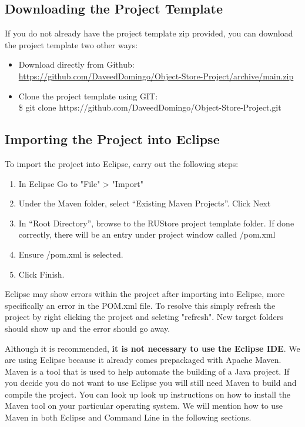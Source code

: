 \documentclass{article}
\begin{document}
\subsection{Downloading the Project Template}
If you do not already have the project template zip provided, you can download the project template two other ways:
\begin{itemize}
\item Download directly from Github:\\ \href{https://github.com/DaveedDomingo/Object-Store-Project/archive/main.zip}{https://github.com/DaveedDomingo/Object-Store-Project/archive/main.zip}
\item Clone the project template using GIT:\\ \$ git clone https://github.com/DaveedDomingo/Object-Store-Project.git
\end{itemize} 

\subsection{Importing the Project into Eclipse}
To import the project into Eclipse, carry out the following steps:
\begin{enumerate}
\item In Eclipse Go to "File" > "Import"
\item Under the Maven folder, select “Existing Maven Projects”. Click Next
\item In “Root Directory”, browse to the RUStore project template folder. If done correctly, there will be an entry under project window called /pom.xml
\item Ensure /pom.xml is selected. 
\item Click Finish.
\end{enumerate}
\begin{info}[Note:]
Eclipse may show errors within the project after importing into Eclipse, more specifically an error in the POM.xml file. To resolve this simply refresh the project by right clicking the project and seleting "refresh". New target folders should show up and the error should go away. 
\end{info}
\begin{info}
Although it is recommended, \textbf{it is not necessary to use the Eclipse IDE}. We are using Eclipse because it already comes prepackaged with Apache Maven. Maven is a tool that is used to help automate the building of a Java project. If you decide you do not want to use Eclipse you will still need Maven to build and compile the project. You can look up look up instructions on how to install the Maven tool on your particular operating system. We will mention how to use Maven in both Eclipse and Command Line in the following sections.
\end{info}
\end{document}
